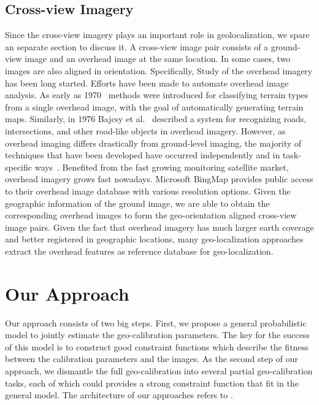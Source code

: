 \subsection{Cross-view Imagery}
Since the cross-view imagery plays an important role in geolocalization,
we spare an separate section to discuss it. A cross-view image
pair consists of a ground-view image and an overhead image at the
same location. In some cases, two images are also aligned in
orientation.
Specifically, Study of the overhead imagery has been long started.
Efforts have been made to automate overhead image analysis. As early
as 1970~\cite{idelsohn1970learning} methods were introduced for
classifying terrain types from a single overhead image, with the goal
of automatically generating terrain maps.  Similarly, in 1976 Bajcsy
et al.~\cite{bajcsy1976computer} described a system for recognizing
roads, intersections, and other road-like objects in overhead imagery.
However, as overhead imaging differs drastically from ground-level
imaging, the majority of techniques that have been developed have
occurred independently and in task-specific ways~\cite{Rozen}.
Benefited from the fast growing monitoring satellite market, overhead
imagery grows fast nowadays. Microsoft BingMap provides public access
to their overhead image database with various resolution options.
Given the geographic information of the ground image, we are able to
obtain the corresponding overhead images to form the geo-orientation
aligned cross-view image pairs.
Given the fact that overhead imagery has much larger earth coverage
and better registered in geographic locations, many geo-localization
approaches~\cite{lin2013cross,lin2015learning,workman2015geocnn,workman2015wide}
extract the overhead features as reference database for
geo-localization.



\section{Our Approach}
Our approach consists of two big steps. First, we propose a general
probabilistic model to jointly estimate the geo-calibration
parameters. The key for the success of this model is to construct good
constraint functions which describe the fitness between the calibration
parameters and the images. As the second step of our approach, we
dismantle the full geo-calibration into several partial
geo-calibration tasks, each of which could provides a strong constraint
function that fit in the general model. The architecture of
our approaches refers to
.

